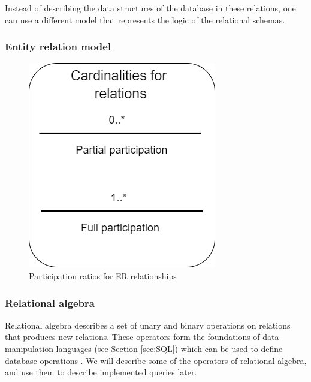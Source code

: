 Instead of describing the data structures of the database in these relations, one can use a different model that represents the logic of the relational schemas.

\subsubsection{Entity relation model}\label{sec:EntityRelationModel}
\begin{figure}
    \centering
    \includegraphics[scale=0.5]{Images/cardinalities.png}
    \caption{Participation ratios for ER relationships}
    \label{fig:ERDiagram_Cardinality}
\end{figure}


\subsubsection{Relational algebra}
Relational algebra describes a set of unary and binary operations on relations that produces new relations.
These operators form the foundations of data manipulation languages (see Section \ref{sec:SQL}) which can be used to define database operations \cite[Chapter 6.2]{DBSBook}.
We will describe some of the operators of relational algebra, and use them to describe implemented queries later.

